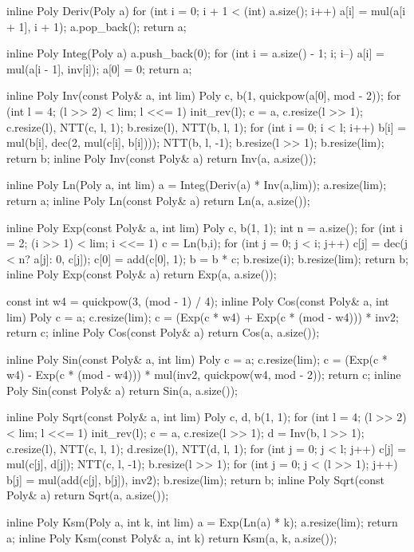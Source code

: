 \begin{Cpp}
{inline Poly Deriv(Poly a) {
  for (int i = 0; i + 1 < (int) a.size(); i++) a[i] = mul(a[i + 1], i + 1);
  a.pop_back();
  return a;
}

inline Poly Integ(Poly a) {
  a.push_back(0);
  for (int i = a.size() - 1; i; i--) a[i] = mul(a[i - 1], inv[i]);
  a[0] = 0;
  return a;
}

inline Poly Inv(const Poly& a, int lim) {
  Poly c, b(1, quickpow(a[0], mod - 2));
  for (int l = 4; (l >> 2) < lim; l <<= 1) {
    init_rev(l);
    c = a, c.resize(l >> 1);
    c.resize(l), NTT(c, l, 1);
    b.resize(l), NTT(b, l, 1);
    for (int i = 0; i < l; i++) b[i] = mul(b[i], dec(2, mul(c[i], b[i])));
    NTT(b, l, -1);
    b.resize(l >> 1);
  }
  b.resize(lim);
  return b;
}
inline Poly Inv(const Poly& a) {return Inv(a, a.size());}

inline Poly Ln(Poly a, int lim) {
  a = Integ(Deriv(a) * Inv(a,lim));
  a.resize(lim);
  return a;
}
inline Poly Ln(const Poly& a) {return Ln(a, a.size());}

inline Poly Exp(const Poly& a, int lim) {
  Poly c, b(1, 1); int n = a.size();
  for (int i = 2; (i >> 1) < lim; i <<= 1) {
    c = Ln(b,i);
    for (int j = 0; j < i; j++) c[j] = dec(j < n? a[j]: 0, c[j]);
    c[0] = add(c[0], 1);
    b = b * c;
    b.resize(i);
  }
  b.resize(lim);
  return b;
}
inline Poly Exp(const Poly& a) {return Exp(a, a.size());}

const int w4 = quickpow(3, (mod - 1) / 4);
inline Poly Cos(const Poly& a, int lim) {
  Poly c = a; c.resize(lim);
  c = (Exp(c * w4) + Exp(c * (mod - w4))) * inv2;
  return c;
}
inline Poly Cos(const Poly& a) {return Cos(a, a.size());}

inline Poly Sin(const Poly& a, int lim) {
  Poly c = a; c.resize(lim);
  c = (Exp(c * w4) - Exp(c * (mod - w4))) * mul(inv2, quickpow(w4, mod - 2));
  return c;
}
inline Poly Sin(const Poly& a) {return Sin(a, a.size());}

inline Poly Sqrt(const Poly& a, int lim) {
  Poly c, d, b(1, 1);
  for (int l = 4; (l >> 2) < lim; l <<= 1) {
    init_rev(l);
    c = a, c.resize(l >> 1);
    d = Inv(b, l >> 1);
    c.resize(l), NTT(c, l, 1);
    d.resize(l), NTT(d, l, 1);
    for (int j = 0; j < l; j++) c[j] = mul(c[j], d[j]);
    NTT(c, l, -1);
    b.resize(l >> 1);
    for (int j = 0; j < (l >> 1); j++) b[j] = mul(add(c[j], b[j]), inv2);
  }
  b.resize(lim);
  return b;
}
inline Poly Sqrt(const Poly& a) {return Sqrt(a, a.size());}

inline Poly Ksm(Poly a, int k, int lim) {
  a = Exp(Ln(a) * k);
  a.resize(lim);
  return a;
}
inline Poly Ksm(const Poly& a, int k) {return Ksm(a, k, a.size());}

}
\end{Cpp}
